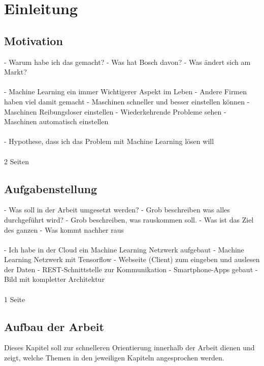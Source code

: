 \chapter{Einleitung}
\label{ch:einleitung}

\section{Motivation}
\label{sec:motivation}
- Warum habe ich das gemacht?
- Was hat Bosch davon?
- Was ändert sich am Markt?
\\ \\
- Machine Learning ein immer Wichtigerer Aspekt im Leben
- Andere Firmen haben viel damit gemacht
- Maschinen schneller und besser einstellen können
- Maschinen Reibungsloser einstellen
- Wiederkehrende Probleme sehen
- Maschinen automatisch einstellen
\\ \\
- Hypothese, dass ich das Problem mit Machine Learning lösen will
\\ \\
2 Seiten

\section{Aufgabenstellung}
\label{sec:aufgabenstellung}
- Was soll in der Arbeit umgesetzt werden?
- Grob beschreiben was alles durchgeführt wird?
- Grob beschreiben, was rauskommen soll.
- Was ist das Ziel des ganzen
- Was kommt nachher raus
\\ \\
- Ich habe in der Cloud ein Machine Learning Netzwerk aufgebaut
- Machine Learning Netzwerk mit Tensorflow
- Webseite (Client) zum eingeben und auslesen der Daten
- REST-Schnittstelle zur Kommunikation
- Smartphone-Apps gebaut
- Bild mit kompletter Architektur
\\ \\
1 Seite

\newpage

\section{Aufbau der Arbeit}
\label{sec:aufbauDerArbeit}
Dieses Kapitel soll zur schnelleren Orientierung innerhalb der Arbeit dienen und zeigt, welche Themen in den jeweiligen
Kapiteln angesprochen werden.

